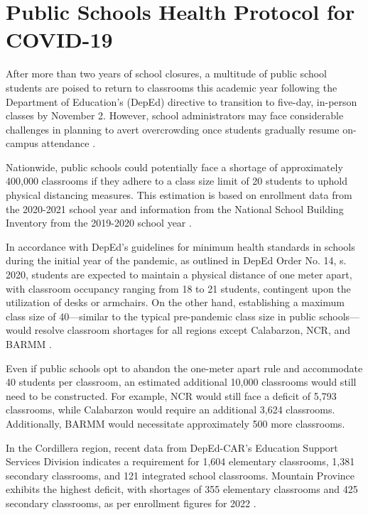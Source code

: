\section{Public Schools Health Protocol for COVID-19}   
After more than two years of school closures, a multitude of public school students are poised to return to classrooms this academic year following the Department of Education's (DepEd) directive to transition to five-day, in-person classes by November 2. However, school administrators may face considerable challenges in planning to avert overcrowding once students gradually resume on-campus attendance \cite{ditsworth_2019_infection}.

Nationwide, public schools could potentially face a shortage of approximately 400,000 classrooms if they adhere to a class size limit of 20 students to uphold physical distancing measures. This estimation is based on enrollment data from the 2020-2021 school year and information from the National School Building Inventory from the 2019-2020 school year \cite{chi_deped_nodate}.

In accordance with DepEd's guidelines for minimum health standards in schools during the initial year of the pandemic, as outlined in DepEd Order No. 14, s. 2020, students are expected to maintain a physical distance of one meter apart, with classroom occupancy ranging from 18 to 21 students, contingent upon the utilization of desks or armchairs. On the other hand, establishing a maximum class size of 40—similar to the typical pre-pandemic class size in public schools—would resolve classroom shortages for all regions except Calabarzon, NCR, and BARMM \cite{chi_2022_deped}.

Even if public schools opt to abandon the one-meter apart rule and accommodate 40 students per classroom, an estimated additional 10,000 classrooms would still need to be constructed. For example, NCR would still face a deficit of 5,793 classrooms, while Calabarzon would require an additional 3,624 classrooms. Additionally, BARMM would necessitate approximately 500 more classrooms.

In the Cordillera region, recent data from DepEd-CAR's Education Support Services Division indicates a requirement for 1,604 elementary classrooms, 1,381 secondary classrooms, and 121 integrated school classrooms. Mountain Province exhibits the highest deficit, with shortages of 355 elementary classrooms and 425 secondary classrooms, as per enrollment figures for 2022 \cite{g_2023_facility}.


